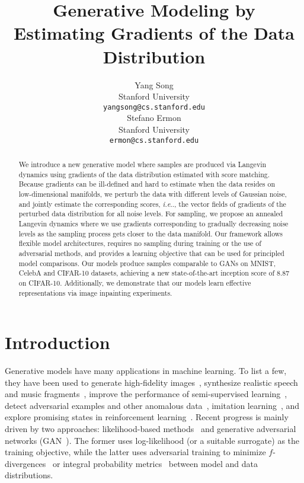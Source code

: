 \documentclass{article}
\title{Generative Modeling by Estimating Gradients of the Data Distribution}
\author{Yang Song\\
  Stanford University\\
  \texttt{yangsong@cs.stanford.edu}\\
  \And
  Stefano Ermon\\
  Stanford University\\
  \texttt{ermon@cs.stanford.edu}
}
\makeatletter
\def\@onedot{\ifx\@let@token.\else.\null\fi\xspace}
\DeclareRobustCommand\onedot{\futurelet\@let@token\@onedot}
\def\ie{\emph{i.e}\onedot}
\makeatother
\begin{document}
\maketitle
\begin{abstract}
We introduce a new generative model where samples are produced 
via Langevin dynamics using gradients of the data distribution estimated with score matching. 
Because gradients can be ill-defined and hard to estimate when the data resides on low-dimensional manifolds, 
we perturb the data with different levels of Gaussian noise, and jointly estimate the corresponding scores, \ie, the vector fields of gradients of the perturbed data distribution for all noise levels. For sampling, we propose an annealed Langevin dynamics where we use gradients corresponding to gradually decreasing noise levels as the 
sampling process
gets closer 
to the data manifold. 
Our framework allows flexible model architectures, requires no sampling during training or the use of adversarial methods, and provides a learning objective that can be used for principled 
model comparisons. Our models produce samples 
comparable 
to GANs on MNIST, CelebA and CIFAR-10 datasets, achieving a new state-of-the-art inception score of 8.87 
on CIFAR-10. Additionally, we demonstrate that our models learn effective representations via image inpainting experiments.
\end{abstract} \section{Introduction}
Generative models have many applications in machine learning. 
To list a few, they have been used to generate high-fidelity images~\cite{karras2018style,brock2018large}, synthesize realistic speech and music fragments~\cite{oord2016wavenet}, improve the performance of semi-supervised learning~\cite{kingma2014semi, dai2017good}, detect adversarial examples and other anomalous data~\cite{song2018pixeldefend}, imitation learning~\cite{ho2016generative}, and explore promising states in reinforcement learning~\cite{ostrovski2017count}.
Recent progress 
is mainly driven by two 
approaches: likelihood-based methods~\cite{graves2013generating, kingma2014auto, dinh2014nice, oord2016pixel} and generative adversarial networks (GAN~\cite{goodfellow2014generative}). The former uses log-likelihood (or a suitable surrogate) as the training objective, while the latter uses adversarial training to minimize $f$-divergences~\cite{nowozin2016f} or integral probability metrics~\cite{arjovsky2017wasserstein,sriperumbudur2009integral} between model and data distributions. 
\end{document}
